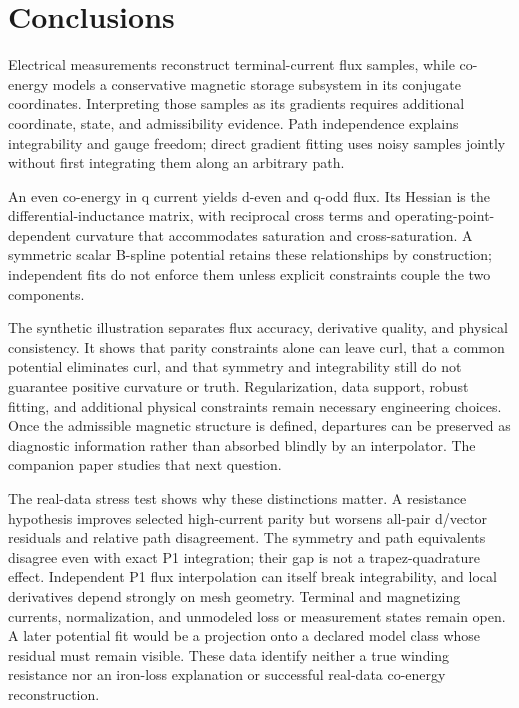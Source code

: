 \section{Conclusions}
Electrical measurements reconstruct terminal-current flux samples, while
co-energy models a conservative magnetic storage subsystem in its conjugate
coordinates. Interpreting those samples as its gradients requires additional
coordinate, state, and admissibility evidence. Path independence explains
integrability and gauge freedom; direct gradient fitting uses noisy samples
jointly without first integrating them along an arbitrary path.

An even co-energy in q current yields d-even and q-odd flux. Its Hessian is
the differential-inductance matrix, with reciprocal cross terms and
operating-point-dependent curvature that accommodates saturation and
cross-saturation. A symmetric scalar B-spline potential retains these
relationships by construction; independent fits do not enforce them unless
explicit constraints couple the two components.

The synthetic illustration separates flux accuracy, derivative quality, and
physical consistency. It shows that parity constraints alone can leave curl,
that a common potential eliminates curl, and that symmetry and integrability
still do not guarantee positive curvature or truth. Regularization, data
support, robust fitting, and additional physical constraints remain necessary
engineering choices. Once the admissible magnetic structure is defined,
departures can be preserved as diagnostic information rather than absorbed
blindly by an interpolator. The companion paper studies that next question.

The real-data stress test shows why these distinctions matter. A resistance
hypothesis improves selected high-current parity but worsens all-pair d/vector
residuals and relative path disagreement. The symmetry and path equivalents
disagree even with exact P1 integration; their gap is not a trapez-quadrature
effect. Independent P1 flux interpolation can itself break integrability,
and local derivatives depend strongly on mesh geometry. Terminal and
magnetizing currents, normalization, and unmodeled loss or measurement states
remain open. A later potential fit would be a projection onto a declared
model class whose residual must remain visible. These data identify neither
a true winding resistance nor an iron-loss explanation or successful real-data
co-energy reconstruction.
